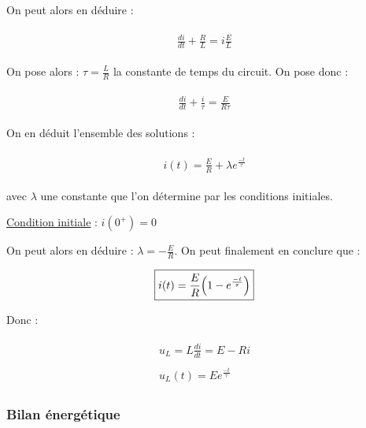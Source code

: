 \documentclass{article}
\begin{document}
On peut alors en déduire :

\begin{align*}\begin{split}
\frac{di}{dt}+\frac{R}{L}=i\frac{E}{L}
\end{split}\end{align*}

On pose alors : $\tau=\frac{L}{R}$ la constante de temps du circuit. On pose donc :

\begin{align*}\begin{split}
\frac{di}{dt}+\frac{i}{\tau}=\frac{E}{R\tau}
\end{split}\end{align*}

On en déduit l'ensemble des solutions :

\begin{align*}\begin{split}
\boxed{i(t)=\frac{E}{R}+\lambda e^\frac{-t}{\tau}}
\end{split}\end{align*}

avec $\lambda$ une constante que l'on détermine par les conditions initiales.

\bigskip

\underline{Condition initiale} : $i(0^+)=0$

On peut alors en déduire : $\lambda=-\frac{E}{R}$. On peut finalement en conclure que :

\begin{align*}\begin{split}
\boxed{i(t)=\frac{E}{R}\Bigl(1-e^\frac{-t}{\tau}\Bigl)}
\end{split}\end{align*}

Donc :

\begin{align*}\begin{split}
    u_L=L\frac{di}{dt}=E-Ri\\\\
    \boxed{u_L(t)=E e^\frac{-t}{\tau}}
\end{split}\end{align*}


\subsubsection{Bilan énergétique}
\end{document}

